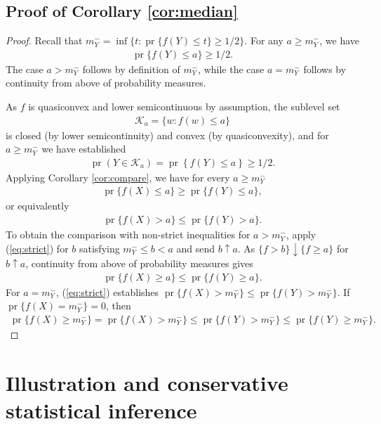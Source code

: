 \documentclass[11pt]{article}
\newcommand{\1}{\mathbbm{1}}
\def\pr{{\operatorname{pr}}}
\theoremstyle{plain}
\theoremstyle{definition}
\begin{document}
\subsection{Proof of Corollary \ref{cor:median}}
\begin{proof}
Recall that $m^-_Y = \inf\{t: \pr\{f(Y)\leq t\} \geq 1/2\}$. For any $a \geq m_Y^{-}$, we have 
\begin{align*}\pr\{f(Y)\leq a\} \geq 1/2.\end{align*} The case $a > m^-_Y$ follows by definition of $m^-_Y$, while the case $a=m^-_Y$ follows by continuity from above of probability measures. 

As $f$ is quasiconvex and lower semicontinuous by assumption, the sublevel set \begin{align*}\mathcal{K}_a = \{w: f(w)\leq a\}\end{align*} is closed (by lower semicontinuity) and convex (by quasiconvexity), and for $a\geq m^-_Y$ we have established
\begin{align*}
\pr(Y\in \mathcal{K}_a) = \pr\left\{f(Y)\leq a\right\} \geq 1/2.
\end{align*}Applying Corollary \ref{cor:compare}, we have for every $a\geq m^-_Y$
\begin{align*}
\pr\{f(X)\leq a\}\geq \pr\{f(Y)\leq a\},
\end{align*}
or equivalently
\begin{align} \label{eq:strict}
\pr\{f(X) > a\} \leq \pr\{f(Y) > a\}.
\end{align}To obtain the comparison with non-strict inequalities for $a > m^-_Y$, apply (\ref{eq:strict}) for $b$ satisfying $m^-_Y\leq b < a$ and send $b\uparrow a$. As $\{f > b\}\downarrow \{f\geq a\}$ for $b\uparrow a$, continuity from above of probability measures gives
\begin{align*}
\pr\{f(X) \geq a\} \leq \pr\{f(Y) \geq a\}.
\end{align*}For $a = m^-_Y$, (\ref{eq:strict}) establishes $\pr\{f(X) > m^-_Y\} \leq \pr\{f(Y) > m^-_Y\}$. If $\pr\{f(X) = m^-_Y\}=0$, then
\begin{align*}
\pr\{f(X) \geq m^-_Y\} = \pr\{f(X) > m^-_Y\} \leq \pr\{f(Y) > m^-_Y\} \leq \pr\{f(Y) \geq m^-_Y\}.
\end{align*}
\end{proof}


\section{Illustration and conservative statistical inference}
\end{document}
